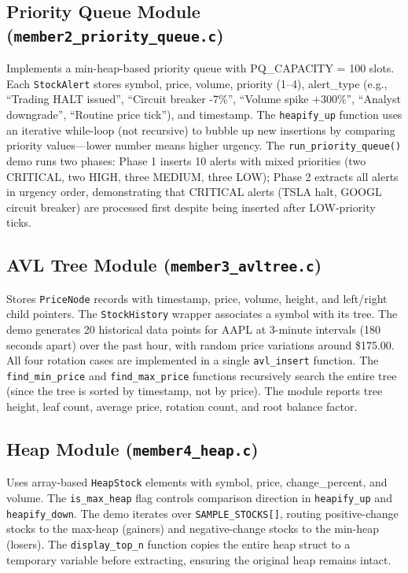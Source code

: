 \documentclass[conference]{IEEEtran}
\begin{document}
\subsection{Priority Queue Module (\texttt{member2\_priority\_queue.c})}

Implements a min-heap-based priority queue with PQ\_CAPACITY = 100 slots. Each \texttt{StockAlert} stores symbol, price, volume, priority (1--4), alert\_type (e.g., ``Trading HALT issued'', ``Circuit breaker -7\%'', ``Volume spike +300\%'', ``Analyst downgrade'', ``Routine price tick''), and timestamp. The \texttt{heapify\_up} function uses an iterative while-loop (not recursive) to bubble up new insertions by comparing priority values---lower number means higher urgency. The \texttt{run\_priority\_queue()} demo runs two phases: Phase 1 inserts 10 alerts with mixed priorities (two CRITICAL, two HIGH, three MEDIUM, three LOW); Phase 2 extracts all alerts in urgency order, demonstrating that CRITICAL alerts (TSLA halt, GOOGL circuit breaker) are processed first despite being inserted after LOW-priority ticks.

\subsection{AVL Tree Module (\texttt{member3\_avltree.c})}

Stores \texttt{PriceNode} records with timestamp, price, volume, height, and left/right child pointers. The \texttt{StockHistory} wrapper associates a symbol with its tree. The demo generates 20 historical data points for AAPL at 3-minute intervals (180 seconds apart) over the past hour, with random price variations around \$175.00. All four rotation cases are implemented in a single \texttt{avl\_insert} function. The \texttt{find\_min\_price} and \texttt{find\_max\_price} functions recursively search the entire tree (since the tree is sorted by timestamp, not by price). The module reports tree height, leaf count, average price, rotation count, and root balance factor.

\subsection{Heap Module (\texttt{member4\_heap.c})}

Uses array-based \texttt{HeapStock} elements with symbol, price, change\_percent, and volume. The \texttt{is\_max\_heap} flag controls comparison direction in \texttt{heapify\_up} and \texttt{heapify\_down}. The demo iterates over \texttt{SAMPLE\_STOCKS[]}, routing positive-change stocks to the max-heap (gainers) and negative-change stocks to the min-heap (losers). The \texttt{display\_top\_n} function copies the entire heap struct to a temporary variable before extracting, ensuring the original heap remains intact.
\end{document}
